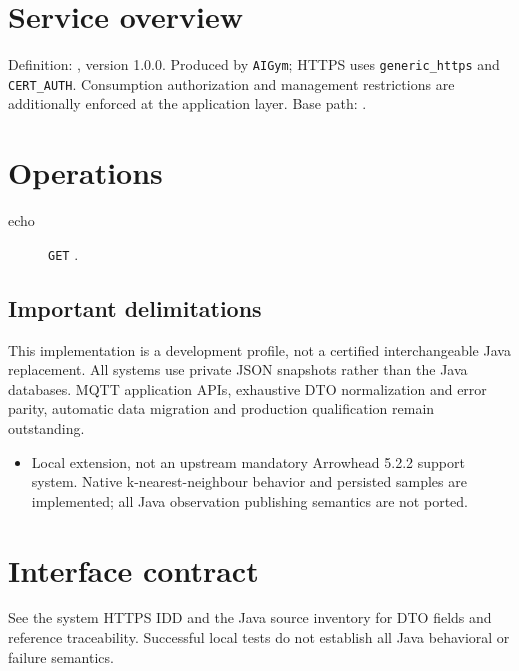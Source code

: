 \documentclass[a4paper]{arrowhead}
\begin{document}
\ArrowheadSetup
\section{Service overview}
Definition: , version 1.0.0. Produced by \texttt{AIGym}; HTTPS uses \texttt{generic\_https} and \texttt{CERT\_AUTH}. Consumption authorization and management restrictions are additionally enforced at the application layer. Base path: .
\section{Operations}
\begin{description}
\item[echo] \texttt{GET} .
\end{description}
\subsection{Important delimitations}
This implementation is a development profile, not a certified interchangeable Java replacement. All systems use private JSON snapshots rather than the Java databases. MQTT application APIs, exhaustive DTO normalization and error parity, automatic data migration and production qualification remain outstanding.
\begin{itemize}
\item Local extension, not an upstream mandatory Arrowhead 5.2.2 support system. Native k-nearest-neighbour behavior and persisted samples are implemented; all Java observation publishing semantics are not ported.
\end{itemize}
\section{Interface contract}
See the system HTTPS IDD and the Java source inventory for DTO fields and reference traceability. Successful local tests do not establish all Java behavioral or failure semantics.
\end{document}
